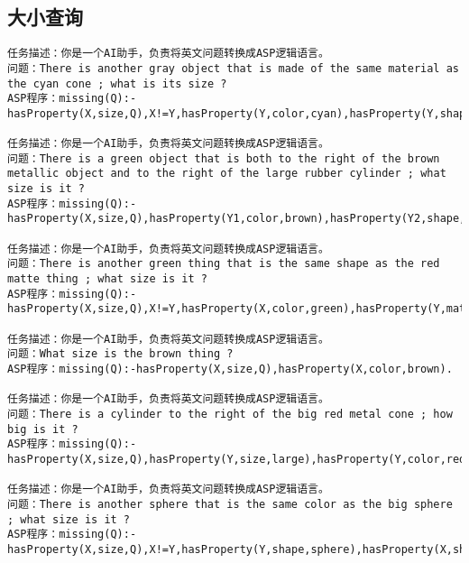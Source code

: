 \subsection{大小查询}
\begin{lstlisting}
任务描述：你是一个AI助手，负责将英文问题转换成ASP逻辑语言。
问题：There is another gray object that is made of the same material as the cyan cone ; what is its size ? 
ASP程序：missing(Q):-hasProperty(X,size,Q),X!=Y,hasProperty(Y,color,cyan),hasProperty(Y,shape,cone),hasProperty(X,color,gray),same_material(Y,X).

任务描述：你是一个AI助手，负责将英文问题转换成ASP逻辑语言。
问题：There is a green object that is both to the right of the brown metallic object and to the right of the large rubber cylinder ; what size is it ? 
ASP程序：missing(Q):-hasProperty(X,size,Q),hasProperty(Y1,color,brown),hasProperty(Y2,shape,cylinder),hasProperty(Y2,size,large),hasProperty(Y2,material,rubber),hasProperty(Y1,material,metal),hasProperty(X,color,green),right(Y1,X),right(Y2,X),X!=Y1,Y1!=Y2,X!=Y2. 

任务描述：你是一个AI助手，负责将英文问题转换成ASP逻辑语言。
问题：There is another green thing that is the same shape as the red matte thing ; what size is it ? 
ASP程序：missing(Q):-hasProperty(X,size,Q),X!=Y,hasProperty(X,color,green),hasProperty(Y,material,rubber),hasProperty(Y,color,red),same_shape(Y,X). 

任务描述：你是一个AI助手，负责将英文问题转换成ASP逻辑语言。
问题：What size is the brown thing ? 
ASP程序：missing(Q):-hasProperty(X,size,Q),hasProperty(X,color,brown). 

任务描述：你是一个AI助手，负责将英文问题转换成ASP逻辑语言。
问题：There is a cylinder to the right of the big red metal cone ; how big is it ? 
ASP程序：missing(Q):-hasProperty(X,size,Q),hasProperty(Y,size,large),hasProperty(Y,color,red),hasProperty(Y,material,metal),hasProperty(Y,shape,cone),hasProperty(X,shape,cylinder),right(Y,X),X!=Y. 

任务描述：你是一个AI助手，负责将英文问题转换成ASP逻辑语言。
问题：There is another sphere that is the same color as the big sphere ; what size is it ? 
ASP程序：missing(Q):-hasProperty(X,size,Q),X!=Y,hasProperty(Y,shape,sphere),hasProperty(X,shape,sphere),hasProperty(Y,size,large),same_color(Y,X).
\end{lstlisting}

